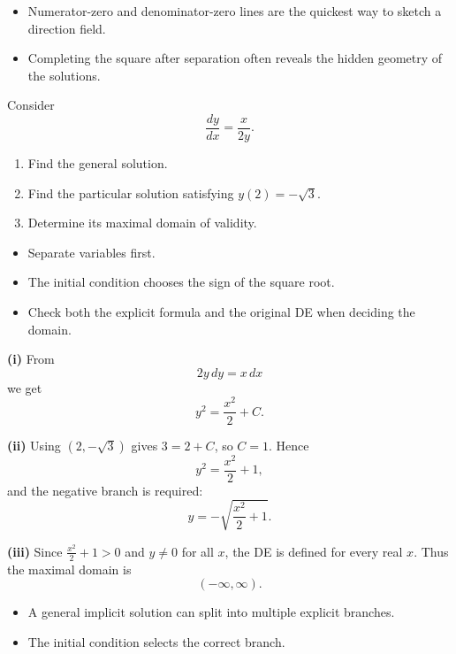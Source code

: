\begin{takeaways}
\begin{itemize}[leftmargin=*]
    \item Numerator-zero and denominator-zero lines are the quickest way to sketch a direction field.
    \item Completing the square after separation often reveals the hidden geometry of the solutions.
\end{itemize}
\end{takeaways}

\begin{problem}
Consider
\[
\frac{dy}{dx}=\frac{x}{2y}.
\]
\begin{enumerate}
    \item[\textbf{i}] Find the general solution.
    \item[\textbf{ii}] Find the particular solution satisfying $y(2)=-\sqrt3$.
    \item[\textbf{iii}] Determine its maximal domain of validity.
\end{enumerate}
\end{problem}

\begin{hint}
\begin{itemize}[leftmargin=*]
    \item Separate variables first.
    \item The initial condition chooses the sign of the square root.
    \item Check both the explicit formula and the original DE when deciding the domain.
\end{itemize}
\end{hint}

\begin{solution}
\textbf{(i)} From
\[
2y\,dy=x\,dx
\]
we get
\[
y^2=\frac{x^2}{2}+C.
\]

\textbf{(ii)} Using $(2,-\sqrt3)$ gives $3=2+C$, so $C=1$. Hence
\[
y^2=\frac{x^2}{2}+1,
\]
and the negative branch is required:
\[
\boxed{y=-\sqrt{\frac{x^2}{2}+1}}.
\]

\textbf{(iii)} Since $\frac{x^2}{2}+1>0$ and $y\neq0$ for all $x$, the DE is defined for every real $x$. Thus the maximal domain is
\[
\boxed{(-\infty,\infty)}.
\]
\end{solution}

\begin{takeaways}
\begin{itemize}[leftmargin=*]
    \item A general implicit solution can split into multiple explicit branches.
    \item The initial condition selects the correct branch.
\end{itemize}
\end{takeaways}

